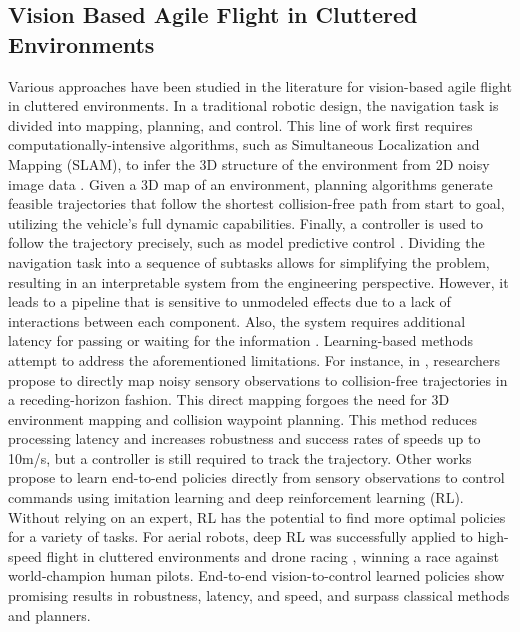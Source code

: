 \documentclass{article}
\begin{document}
\subsection{Vision Based Agile Flight in Cluttered Environments}
Various approaches have been studied in the literature for vision-based agile flight in cluttered environments. In a traditional robotic design, the navigation task is divided into mapping, planning, and control. This line of work first requires computationally-intensive algorithms, such as Simultaneous Localization and Mapping (SLAM), to infer the 3D structure of the environment from 2D noisy image data \cite{zhouSwarmMicroFlying2022, scaramuzzaVisionControlledMicroFlying2014}. Given a 3D map of an environment, planning algorithms generate feasible trajectories that follow the shortest collision-free path from start to goal, utilizing the vehicle’s full dynamic capabilities. Finally, a controller is used to follow the trajectory precisely, such as model predictive control \cite{falangaPAMPCPerceptionAwareModel2018}. Dividing the navigation task into a sequence of subtasks allows for simplifying the problem, resulting in an interpretable system from the engineering perspective. However, it leads to a pipeline that is sensitive to unmodeled effects due to a lack of interactions between each component. Also, the system requires additional latency for passing or waiting for the information \cite{loquercioLearningHighSpeedFlight2021}. Learning-based methods attempt to address the aforementioned limitations. For instance, in \cite{loquercioLearningHighSpeedFlight2021}, researchers propose to directly map noisy sensory observations to collision-free trajectories in a receding-horizon fashion. This direct mapping forgoes the need for 3D environment mapping and collision waypoint planning. This method reduces processing latency and increases robustness and success rates of speeds up to 10m/s, but a controller is still required to track the trajectory. Other works propose to learn end-to-end policies directly from sensory observations to control commands using imitation learning and deep reinforcement learning (RL). Without relying on an expert, RL has the potential to find more optimal policies for a variety of tasks. For aerial robots, deep RL was successfully applied to high-speed flight in cluttered environments \cite{songLearningPerceptionAwareAgile2023} and drone racing \cite{kaufmannChampionlevelDroneRacing2023}, winning a race against world-champion human pilots. End-to-end vision-to-control learned policies show promising results in robustness, latency, and speed, and surpass classical methods and planners.
\end{document}
